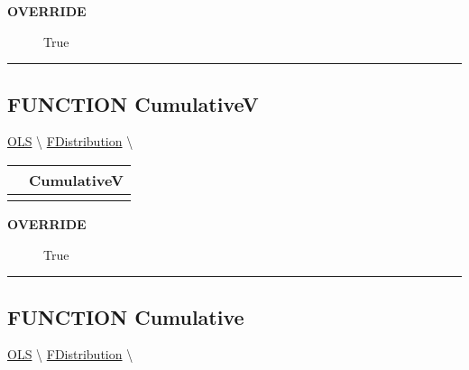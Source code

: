 \par

\par
\begin{description}
\item [\colorbox{tagtype}{\color{white} \textbf{\textsf{OVERRIDE}}}] \textbf{\underline{}} True
\end{description}

\rule{\linewidth}{0.5pt}
\subsection*{\textsf{\colorbox{headtoc}{\color{white} FUNCTION}
CumulativeV}}

\hypertarget{ecldoc:linearregression.ols.distributionbase.cumulativev}{}
\hspace{0pt} \hyperlink{ecldoc:linearregression.ols}{OLS} \textbackslash 
\hspace{0pt} \hyperlink{ecldoc:linearregression.ols.fdistribution}{FDistribution} \textbackslash 

{\renewcommand{\arraystretch}{1.5}
\begin{tabularx}{\textwidth}{|>{\raggedright\arraybackslash}l|X|}
\hline
\hspace{0pt}\mytexttt{\color{red} } & \textbf{CumulativeV} \\
\hline
\multicolumn{2}{|>{\raggedright\arraybackslash}X|}{\hspace{0pt}\mytexttt{\color{param} ()}} \\
\hline
\end{tabularx}
}

\par

\par
\begin{description}
\item [\colorbox{tagtype}{\color{white} \textbf{\textsf{OVERRIDE}}}] \textbf{\underline{}} True
\end{description}

\rule{\linewidth}{0.5pt}
\subsection*{\textsf{\colorbox{headtoc}{\color{white} FUNCTION}
Cumulative}}

\hypertarget{ecldoc:linearregression.ols.distributionbase.cumulative}{}
\hspace{0pt} \hyperlink{ecldoc:linearregression.ols}{OLS} \textbackslash 
\hspace{0pt} \hyperlink{ecldoc:linearregression.ols.fdistribution}{FDistribution} \textbackslash 

